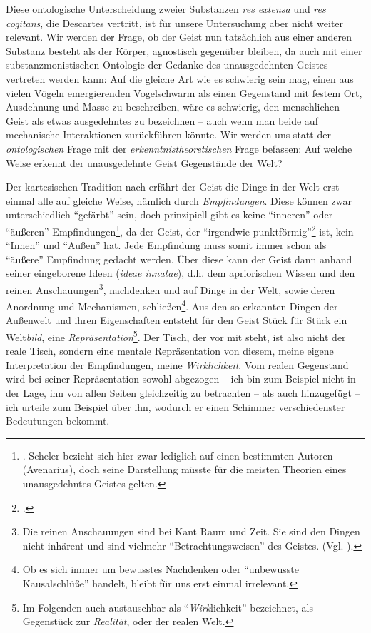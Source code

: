 \documentclass[a4paper, 12pt]{article}
\begin{document}
\begin{onehalfspace}
Diese ontologische Unterscheidung zweier Substanzen \emph{res extensa} und \emph{res cogitans}, die Descartes vertritt, ist für unsere Untersuchung aber nicht weiter relevant. Wir werden der Frage, ob der Geist nun tatsächlich aus einer anderen Substanz besteht als der Körper, agnostisch gegenüber bleiben, da auch mit einer substanzmonistischen Ontologie der Gedanke des unausgedehnten Geistes vertreten werden kann: Auf die gleiche Art wie es schwierig sein mag, einen aus vielen Vögeln emergierenden Vogelschwarm als einen Gegenstand mit festem Ort, Ausdehnung und Masse zu beschreiben, wäre es schwierig, den menschlichen Geist als etwas ausgedehntes zu bezeichnen -- auch wenn man beide auf mechanische Interaktionen zurückführen könnte. Wir werden uns statt der \emph{ontologischen} Frage mit der \emph{erkenntnistheoretischen} Frage befassen: Auf welche Weise erkennt der unausgedehnte Geist Gegenstände der Welt?


Der kartesischen Tradition nach erfährt der Geist die Dinge in der Welt erst einmal alle auf gleiche Weise, nämlich durch \emph{Empfindungen}. Diese können zwar unterschiedlich "`gefärbt"' sein, doch prinzipiell gibt es keine "`inneren"' oder "`äußeren"' Empfindungen\footnote{\Cite[Vgl.][S. 501]{scheler-ethik}. Scheler bezieht sich hier zwar lediglich auf einen bestimmten Autoren (Avenarius), doch seine Darstellung müsste für die meisten Theorien eines unausgedehntes Geistes gelten.}, da der Geist, der "`irgendwie punktförmig"'\footnote{\Cite[Siehe][S. 270]{scheler-idole}.} ist, kein "`Innen"' und "`Außen"' hat. Jede Empfindung muss somit immer schon als "`äußere"' Empfindung gedacht werden. Über diese kann der Geist dann anhand seiner eingeborene Ideen (\emph{ideae innatae}), d.h. dem apriorischen Wissen und den reinen Anschauungen\footnote{Die reinen Anschauungen sind bei Kant Raum und Zeit. Sie sind den Dingen nicht inhärent und sind vielmehr "`Betrachtungsweisen"' des Geistes. (Vgl. \cite{sep-kant}).}, nachdenken und auf Dinge in der Welt, sowie deren Anordnung und Mechanismen, schließen\footnote{Ob es sich immer um bewusstes Nachdenken oder "`unbewusste Kausalschlüße"' handelt, bleibt für uns erst einmal irrelevant.}. Aus den so erkannten Dingen der Außenwelt und ihren Eigenschaften entsteht für den Geist Stück für Stück ein Welt\emph{bild}, eine \emph{Repräsentation}\footnote{Im Folgenden auch austauschbar als "`\emph{Wirk}lichkeit"' bezeichnet, als Gegenstück zur \emph{Realität}, oder der realen Welt.}. Der Tisch, der vor mit steht, ist also nicht der reale Tisch, sondern eine mentale Repräsentation von diesem, meine eigene Interpretation der Empfindungen, meine \emph{Wirklichkeit}. Vom realen Gegenstand wird bei seiner Repräsentation sowohl abgezogen -- ich bin zum Beispiel nicht in der Lage, ihn von allen Seiten gleichzeitig zu betrachten -- als auch hinzugefügt -- ich urteile zum Beispiel über ihn, wodurch er einen Schimmer verschiedenster Bedeutungen bekommt.


\end{onehalfspace}
\end{document}
